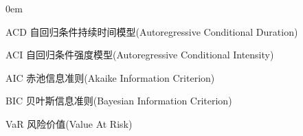\begin{denotation}
\itemsep 0em

\item [ACD] 自回归条件持续时间模型(Autoregressive Conditional Duration)
\item [ACI] 自回归条件强度模型(Autoregressive Conditional Intensity)  
\item [AIC] 赤池信息准则(Akaike Information Criterion)
\item [BIC] 贝叶斯信息准则(Bayesian Information Criterion)
\item [VaR] 风险价值(Value At Risk)
\end{denotation}
